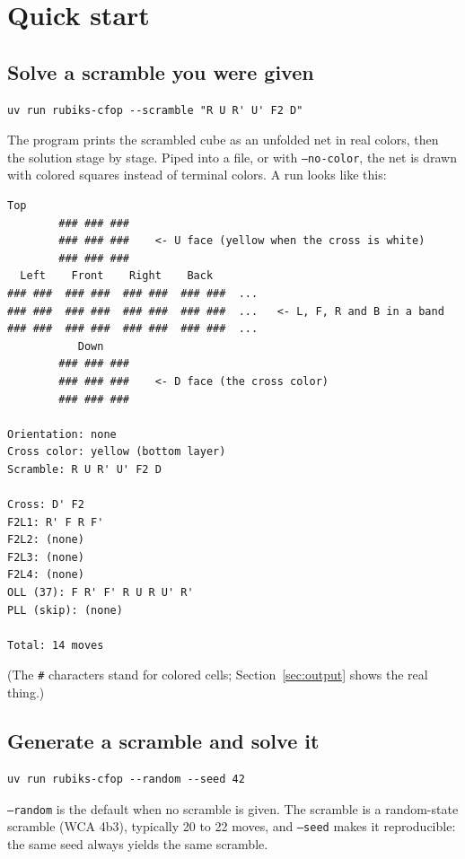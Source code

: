 \section{Quick start}
\label{sec:quickstart}

\subsection{Solve a scramble you were given}

\begin{lstlisting}[style=shell]
uv run rubiks-cfop --scramble "R U R' U' F2 D"
\end{lstlisting}

The program prints the scrambled cube as an unfolded net in real colors, then the
solution stage by stage.  Piped into a file, or with \texttt{--no-color}, the net is
drawn with colored squares instead of terminal colors.  A run looks like this:

\begin{lstlisting}[style=shell]
           Top
        ### ### ###
        ### ### ###    <- U face (yellow when the cross is white)
        ### ### ###
  Left    Front    Right    Back
### ###  ### ###  ### ###  ### ###  ...
### ###  ### ###  ### ###  ### ###  ...   <- L, F, R and B in a band
### ###  ### ###  ### ###  ### ###  ...
           Down
        ### ### ###
        ### ### ###    <- D face (the cross color)
        ### ### ###

Orientation: none
Cross color: yellow (bottom layer)
Scramble: R U R' U' F2 D

Cross: D' F2
F2L1: R' F R F'
F2L2: (none)
F2L3: (none)
F2L4: (none)
OLL (37): F R' F' R U R U' R'
PLL (skip): (none)

Total: 14 moves
\end{lstlisting}

(The \texttt{\#} characters stand for colored cells; Section~\ref{sec:output}
shows the real thing.)

\subsection{Generate a scramble and solve it}

\begin{lstlisting}[style=shell]
uv run rubiks-cfop --random --seed 42
\end{lstlisting}

\texttt{--random} is the default when no scramble is given.  The scramble is a
random-state scramble (WCA 4b3), typically 20 to 22 moves, and \texttt{--seed}
makes it reproducible: the same seed always yields the same scramble.

